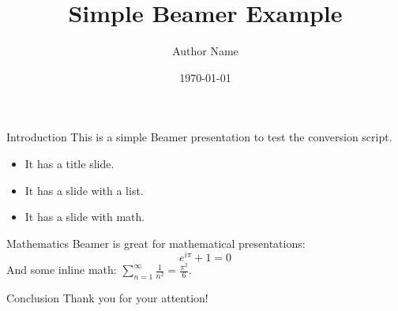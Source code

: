 \documentclass[aspectratio=169]{beamer}
\title{Simple Beamer Example}
\author{Author Name}
\date{\today}
\begin{document}
\begin{frame}
    \titlepage
\end{frame}

\begin{frame}{Introduction}
    This is a simple Beamer presentation to test the conversion script.
    \begin{itemize}
        \item It has a title slide.
        \item It has a slide with a list.
        \item It has a slide with math.
    \end{itemize}
\end{frame}

\begin{frame}{Mathematics}
    Beamer is great for mathematical presentations:
    \begin{equation}
        e^{i\pi} + 1 = 0
    \end{equation}
    And some inline math: $\sum_{n=1}^{\infty} \frac{1}{n^2} = \frac{\pi^2}{6}$.
\end{frame}

\begin{frame}{Conclusion}
    Thank you for your attention!
\end{frame}
\end{document}

